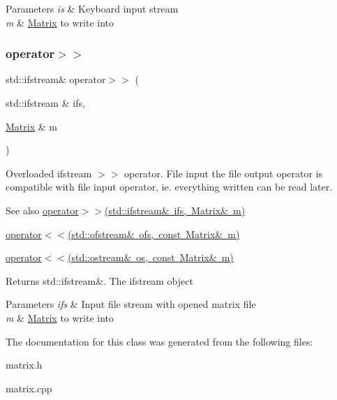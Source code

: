 \begin{DoxyParams}{Parameters}
{\em is} & Keyboard input stream \\
\hline
{\em m} & \mbox{\hyperlink{classMatrix}{Matrix}} to write into \\
\hline
\end{DoxyParams}
\mbox{\label{classMatrix_aa5699a0bdf0ee014f083ff8a76629d21}} 
\subsubsection{\texorpdfstring{operator$>$$>$}{operator>>}\hspace{0.1cm}{\footnotesize\ttfamily [2/2]}}
{\footnotesize\ttfamily std\+::ifstream\& operator$>$$>$ (\begin{DoxyParamCaption}\item[{std\+::ifstream \&}]{ifs,  }\item[{\mbox{\hyperlink{classMatrix}{Matrix}} \&}]{m }\end{DoxyParamCaption})\hspace{0.3cm}{\ttfamily [friend]}}

Overloaded ifstream $>$$>$ operator. File input the file output operator is compatible with file input operator, ie. everything written can be read later. \begin{DoxySeeAlso}{See also}
\mbox{\hyperlink{classMatrix_aa5699a0bdf0ee014f083ff8a76629d21}{operator$>$$>$(std\+::ifstream\& ifs, Matrix\& m)}} 

\mbox{\hyperlink{classMatrix_aa574249d63b390cf1108d6e82047ef61}{operator$<$$<$(std\+::ofstream\& ofs, const Matrix\& m)}} 

\mbox{\hyperlink{classMatrix_a060711074cb5bcaf4e75498bc040c4b7}{operator$<$$<$(std\+::ostream\& os, const Matrix\& m)}} 
\end{DoxySeeAlso}
\begin{DoxyReturn}{Returns}
std\+::ifstream\&. The ifstream object 
\end{DoxyReturn}

\begin{DoxyParams}{Parameters}
{\em ifs} & Input file stream with opened matrix file \\
\hline
{\em m} & \mbox{\hyperlink{classMatrix}{Matrix}} to write into \\
\hline
\end{DoxyParams}


The documentation for this class was generated from the following files\+:\begin{DoxyCompactItemize}
\item 
matrix.\+h\item 
matrix.\+cpp\end{DoxyCompactItemize}
